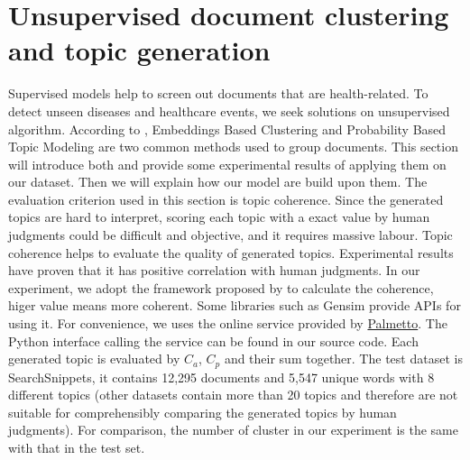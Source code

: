 \section{Unsupervised document clustering and topic generation}
\label{sec:unsupervised}
Supervised models help to screen out documents that are health-related. To detect unseen diseases and healthcare events, we seek solutions on unsupervised algorithm. According to \cite{allahyari2017brief}, Embeddings Based Clustering and Probability Based Topic Modeling are two common methods used to group documents. This section will introduce both and provide some experimental results of applying them on our dataset. Then we will explain how our model are build upon them. The evaluation criterion used in this section is topic coherence. Since the generated topics are hard to interpret, scoring each topic with a exact value by human judgments could be difficult and objective, and it requires massive labour. Topic coherence helps to evaluate the quality of generated topics. Experimental results have proven that it has positive correlation with human judgments. In our experiment, we adopt the framework proposed by \cite{roder2015exploring} to calculate the coherence, higer value means more coherent. Some libraries such as Gensim provide APIs for using it. For convenience, we uses the online service provided by \href{https://palmetto.demos.dice-research.org/}{Palmetto}. The Python interface calling the service can be found in our source code. Each generated topic is evaluated by $C_a$, $C_p$ and their sum together. The test dataset is SearchSnippets, it contains 12,295 documents and 5,547 unique words with 8 different topics (other datasets contain more than 20 topics and therefore are not suitable for comprehensibly comparing the generated topics by human judgments). For comparison, the number of cluster in our experiment is the same with that in the test set. 

